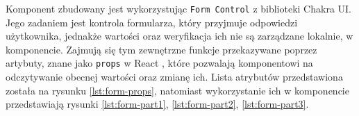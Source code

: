 Komponent zbudowany jest wykorzystując \texttt{Form Control} z biblioteki Chakra UI. Jego zadaniem jest kontrola
formularza, który przyjmuje odpowiedzi użytkownika, jednakże wartości oraz weryfikacja ich nie są zarządzane lokalnie,
w komponencie. Zajmują się tym zewnętrzne funkcje przekazywane poprzez artybuty, znane jako \texttt{props} w
React \cite{react-docs}, które pozwalają komponentowi na odczytywanie obecnej wartości oraz zmianę ich. Lista atrybutów
przedstawiona została na rysunku \ref{lst:form-props}, natomiast wykorzystanie ich w komponencie przedstawiają
rysunki \ref{lst:form-part1}, \ref{lst:form-part2}, \ref{lst:form-part3}.




